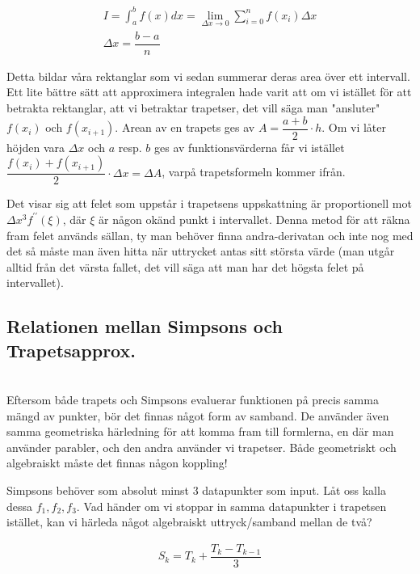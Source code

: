 \begin{equation*}
  \begin{gathered}
    I=\int_{a}^{b}f(x)dx=\lim_{\Delta x\to0}\sum_{i=0}^{n}f(x_i)\Delta x\\
    \Delta x = \dfrac{b-a}{n}
    \end{gathered}
    \end{equation*}
    \par\bigskip
\noindent Detta bildar våra rektanglar som vi sedan summerar deras area över ett intervall. Ett lite bättre sätt att approximera integralen hade varit att om vi istället för att betrakta rektanglar, att vi betraktar trapetser, det vill säga man "ansluter" $f(x_i)$ och $f(x_{i+1})$. Arean av en trapets ges av $A=\dfrac{a+b}{2}\cdot h$. Om vi låter höjden vara $\Delta x$ och $a$ resp. $b$ ges av funktionsvärderna får vi istället $\dfrac{f(x_i)+f(x_{i+1})}{2}\cdot\Delta x=\Delta A$, varpå trapetsformeln kommer ifrån. 
\par\bigskip
\noindent Det visar sig att felet som uppstår i trapetsens uppskattning är proportionell mot $\Delta x^3f^{\prime\prime}(\xi)$, där $\xi$ är någon okänd punkt i intervallet. Denna metod för att räkna fram felet används sällan, ty man behöver finna andra-derivatan och inte nog med det så måste man även hitta när uttrycket antas sitt största värde (man utgår alltid från det värsta fallet, det vill säga att man har det högsta felet på intervallet).
\par\bigskip

\subsection{Relationen mellan Simpsons och Trapetsapprox.}\hfill\\

\noindent Eftersom både trapets och Simpsons evaluerar funktionen på precis samma mängd av punkter, bör det finnas något form av samband. De använder även samma geometriska härledning för att komma fram till formlerna, en där man använder parabler, och den andra använder vi trapetser. Både geometriskt och algebraiskt måste det finnas någon koppling!
\par\bigskip
\noindent Simpsons behöver som absolut minst 3 datapunkter som input. Låt oss kalla dessa $f_1, f_2, f_3$. Vad händer om vi stoppar in samma datapunkter i trapetsen istället, kan vi härleda något algebraiskt uttryck/samband mellan de två?


\begin{equation*}
  \begin{gathered}
    S_k=T_k+\dfrac{T_k-T_{k-1}}{3}
    \end{gathered}
    \end{equation*}

